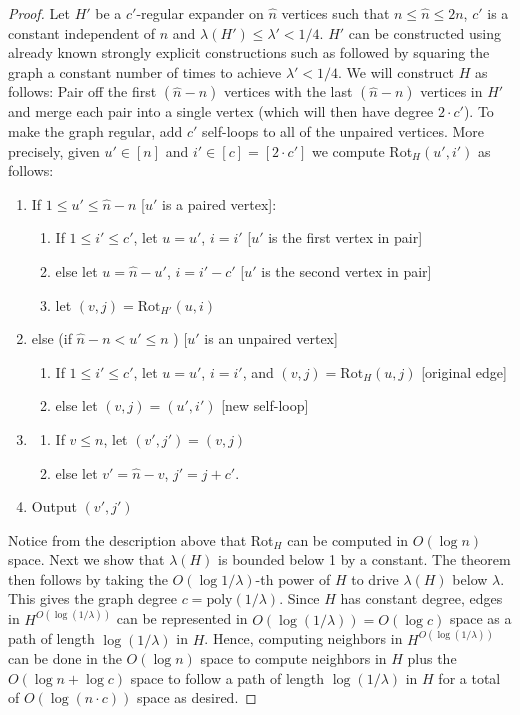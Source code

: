 \documentclass{toc}
\numberwithin{myalgctr}{section}
\theoremstyle{named}
\begin{document}
\begin{proof}
Let $H'$ be a $c'$-regular expander on $\hat{n}$ vertices such that $n\leq \hat{n}\leq 2n$, $c'$ is a constant independent of $n$ and $\lambda(H')\leq \lambda'<1/4$. $H'$ can be constructed using already known strongly explicit constructions such as \cite{GabberGa81,ReingoldVaWi01} followed by squaring the graph a constant number of times to achieve $\lambda'<1/4$. We will construct $H$ as follows: Pair off the first $(\hat{n}-n)$ vertices with the last $(\hat{n}-n)$ vertices in $H'$ and merge each pair into a single vertex (which will then have degree $2\cdot c'$). To make the graph regular, add $c'$ self-loops to all of the unpaired vertices. More precisely, given $u'\in[n]$ and $i'\in[c]=[2\cdot c']$ we compute Rot$_{H}(u',i')$ as follows:
\begin{enumerate}
\item If $1\leq u'\leq \hat{n}-n$ [$u'$ is a paired vertex]:
\begin{enumerate}
\item If $1\leq i'\leq c'$, let $u=u'$, $i=i'$ [$u'$ is the first vertex in pair]
\item else let $u=\hat{n}-u'$, $i=i'-c'$ [$u'$ is the second vertex in pair]
\item let $(v,j)=\mathrm{Rot}_{H'}(u,i)$
\end{enumerate}
\item else (if $\hat{n}-n< u'\leq n$ ) [$u'$ is an unpaired vertex]
\begin{enumerate}
\item If $1\leq i'\leq c'$, let $u=u'$, $i=i'$, and $(v,j)=\mathrm{Rot}_H(u,j)$ [original edge]
\item else let $(v,j)=(u',i')$ [new self-loop]
\end{enumerate}
\item
\begin{enumerate}
\item If $v\leq n$, let $(v',j')= (v,j)$
\item else let $v'=\hat{n}-v$, $j'=j+c'$.
\end{enumerate}
\item Output $(v',j')$
\end{enumerate}

Notice from the description above that Rot$_{H}$ can be computed in $O(\log n)$ space. Next we show that $\lambda(H)$ is bounded below 1 by a constant. The theorem then follows by taking the $O(\log 1/\lambda)$-th power of $H$ to drive $\lambda(H)$ below $\lambda$. This gives the graph degree $c=\mathrm{poly}(1/\lambda)$. Since $H$ has constant degree, edges in $H^{O(\log(1/\lambda))}$ can be represented in $O(\log(1/\lambda))=O(\log c)$ space as a path of length $\log(1/\lambda)$ in $H$. Hence, computing neighbors in $H^{O(\log(1/\lambda))}$ can be done in the $O(\log n)$ space to compute neighbors in $H$ plus the $O(\log n+\log c)$ space to follow a path of length $\log(1/\lambda)$ in $H$ for a total of $O(\log(n\cdot c))$ space as desired.




\end{proof}
\end{document}
